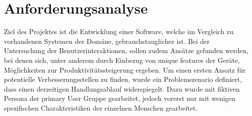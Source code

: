 
\section{Anforderungsanalyse}
Ziel des Projektes ist die Entwicklung einer Software, welche im Vergleich zu vorhandenen Systemen der Domäne, gebrauchstauglicher ist. Bei der Untersuchung der Benutzerinteraktionen, sollen zudem Ansätze gefunden werden, bei denen sich, unter anderem durch Einbezug von unique features der Geräte, Möglichkeiten zur Produktivitätssteigerung ergeben. 
Um einen ersten Ansatz für potentielle Verbesserungsstellen zu finden, wurde ein Problemszenario definiert, dass einen derzeitigen Handlungsablauf widerspiegelt. Dazu wurde mit fiktiven Persona der primary User Gruppe gearbeitet, jedoch vorerst nur mit wenigen spezifischen Charakteristiken der einzelnen Menschen gearbeitet.\\

